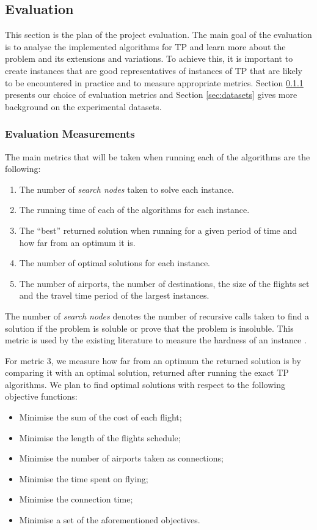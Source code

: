 \documentclass{mprop}
\theoremstyle{definition}
\begin{document}
\subsection{Evaluation}
\label{sec:evaluation}

This section is the plan of the project evaluation. The main goal of the evaluation is to analyse the implemented algorithms for TP and learn more about the problem and its extensions and variations. To achieve this, it is important to create instances that are good representatives of instances of TP that are likely to be encountered in practice and to measure appropriate metrics. 
Section \ref{sec:evaluationgoals} presents our choice of evaluation metrics and Section \ref{sec:datasets} gives more background on the experimental datasets.

\subsubsection{Evaluation Measurements}
\label{sec:evaluationgoals}

The main metrics that will be taken when running each of the algorithms are the following:
\begin{enumerate}
\item The number of \textit{search nodes} taken to solve each instance.
\item The running time of each of the algorithms for each instance.
\item The ``best'' returned solution when running for a given period of time and how far from an optimum it is.
\item The number of optimal solutions for each instance.
\item The number of airports, the number of destinations, the size of the flights set and the travel time period of the largest instances.
\end{enumerate}

The number of \textit{search nodes} denotes the number of recursive calls taken to find a solution if the problem is soluble or prove that the problem is insoluble. This metric is used by the existing literature to measure the hardness of an instance \citep{McCreesh16}.

For metric 3, we measure how far from an optimum the returned solution is by comparing it with an optimal solution, returned after running the exact TP algorithms. We plan to find optimal solutions with respect to the following objective functions:

\begin{itemize}
\item Minimise the sum of the cost of each flight;
\item Minimise the length of the flights schedule;
\item Minimise the number of airports taken as connections;
\item Minimise the time spent on flying;
\item Minimise the connection time;
\item Minimise a set of the aforementioned objectives. 
\end{itemize}
\end{document}

